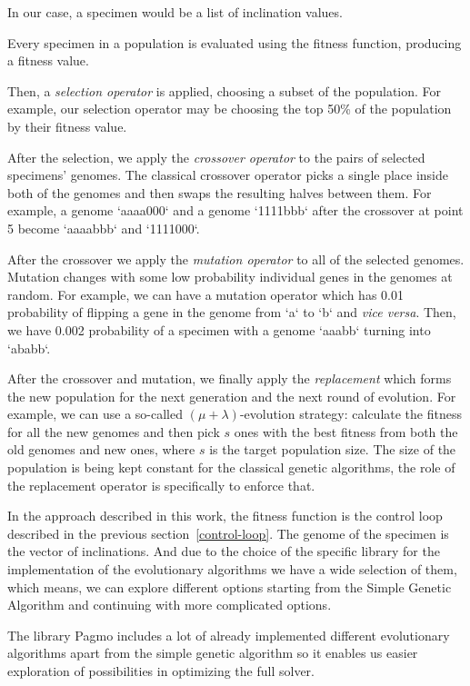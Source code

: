 \documentclass[11pt, a4paper]{article}
\begin{document}
  In our case, a specimen would be a list of inclination values.

  Every specimen in a population is evaluated using the fitness function, producing a fitness value.

  Then, a \textit{selection operator} is applied, choosing a subset of the population.
  For example, our selection operator may be choosing the top 50\% of the population by their fitness value.

  After the selection, we apply the \textit{crossover operator} to the pairs of selected specimens' genomes.
  The classical crossover operator picks a single place inside both of the genomes and then swaps the resulting halves between them.
  For example, a genome `aaaa000` and a genome `1111bbb` after the crossover at point 5 become `aaaabbb` and `1111000`.

  After the crossover we apply the \textit{mutation operator} to all of the selected genomes.
  Mutation changes with some low probability individual genes in the genomes at random.
  For example, we can have a mutation operator which has 0.01 probability of flipping a gene in the genome from `a` to `b` and \textit{vice versa}.
  Then, we have 0.002 probability of a specimen with a genome `aaabb` turning into `ababb`.

  After the crossover and mutation, we finally apply the \textit{replacement} which forms the new population for the next generation and the next round of evolution.
  For example, we can use a so-called $\left(\mu + \lambda\right)$-evolution strategy: calculate the fitness for all the new genomes and then pick $s$ ones with the best fitness from both the old genomes and new ones, where $s$ is the target population size.
  The size of the population is being kept constant for the classical genetic algorithms, the role of the replacement operator is specifically to enforce that.

  In the approach described in this work, the fitness function is the control loop described in the previous section~\ref{control-loop}.
  The genome of the specimen is the vector of inclinations.
	And due to the choice of the specific library for the implementation of the evolutionary algorithms we have a wide selection of them,
  which means, we can explore different options starting from the Simple Genetic Algorithm and continuing with more complicated options.

	The library Pagmo \cite{Biscani2020} includes a lot of already implemented different evolutionary algorithms apart from the simple genetic algorithm so it enables us easier exploration of possibilities in optimizing the full solver.
\end{document}
